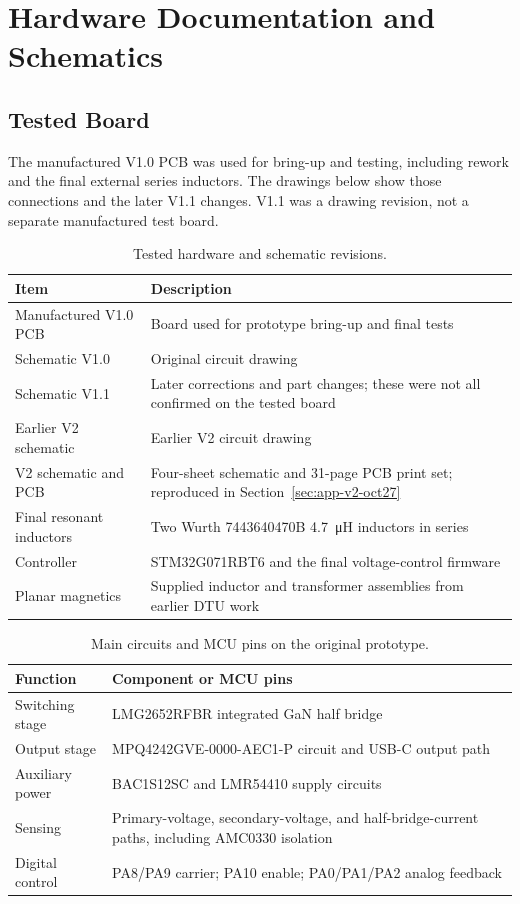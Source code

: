 \chapter{Hardware Documentation and Schematics}
\label{app:hardware}

\section{Tested Board}

The manufactured V1.0 PCB was used for bring-up and testing, including rework and the final external series inductors. The drawings below show those connections and the later V1.1 changes. V1.1 was a drawing revision, not a separate manufactured test board.

\begin{table}[htbp]
\centering
\caption{Tested hardware and schematic revisions.}
\label{tab:app-revision-register}
\begin{tabularx}{\textwidth}{@{}L{0.27\textwidth}Y@{}}
\toprule
Item & Description\\
\midrule
Manufactured V1.0 PCB & Board used for prototype bring-up and final tests\\
Schematic V1.0 & Original circuit drawing\\
Schematic V1.1 & Later corrections and part changes; these were not all confirmed on the tested board\\
Earlier V2 schematic & Earlier V2 circuit drawing\\
V2 schematic and PCB & Four-sheet schematic and 31-page PCB print set; reproduced in Section~\ref{sec:app-v2-oct27}\\
Final resonant inductors & Two Wurth 7443640470B \SI{4.7}{\micro\henry} inductors in series\\
Controller & STM32G071RBT6 and the final voltage-control firmware\\
Planar magnetics & Supplied inductor and transformer assemblies from earlier DTU work\\
\bottomrule
\end{tabularx}
\end{table}

\begin{table}[htbp]
\centering
\caption{Main circuits and MCU pins on the original prototype.}
\label{tab:app-hw-anchors}
\begin{tabularx}{\textwidth}{@{}L{0.27\textwidth}Y@{}}
\toprule
Function & Component or MCU pins\\
\midrule
Switching stage & LMG2652RFBR integrated GaN half bridge\\
Output stage & MPQ4242GVE-0000-AEC1-P circuit and USB-C output path\\
Auxiliary power & BAC1S12SC and LMR54410 supply circuits\\
Sensing & Primary-voltage, secondary-voltage, and half-bridge-current paths, including AMC0330 isolation\\
Digital control & PA8/PA9 carrier; PA10 enable; PA0/PA1/PA2 analog feedback\\
\bottomrule
\end{tabularx}
\end{table}

